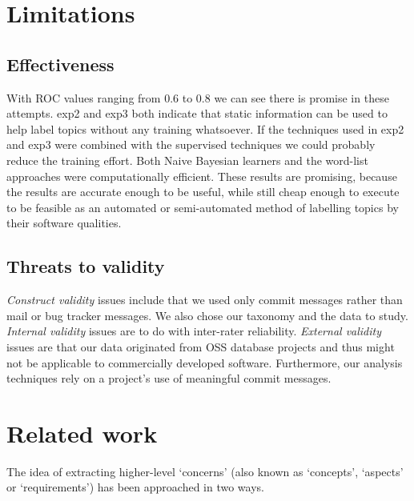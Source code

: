\documentclass[]{sig-alternate}
\begin{document}
\section{Limitations}
\subsection{Effectiveness}


With ROC values ranging from $0.6$ to $0.8$ we can see there is promise in these attempts. \textsf{exp2} and \textsf{exp3} both indicate that static information can be used to help label topics without any training whatsoever. If the techniques used in \textsf{exp2} and \textsf{exp3} were combined with the supervised techniques we could probably reduce the training effort. 
Both Naive Bayesian learners and the word-list approaches were computationally efficient.  These results are promising, because the results are accurate enough to be useful, while still cheap enough to execute to be feasible as an automated or semi-automated method of labelling topics by their software qualities.


\subsection{Threats to validity}
\emph{Construct validity} issues include that we used only commit messages rather than mail or bug tracker messages. We also chose our taxonomy and the data to study. \emph{Internal validity} issues are to do with inter-rater reliability. \emph{External validity} issues are that our data originated from OSS database projects and thus might not be applicable to commercially developed software. Furthermore, our analysis techniques rely on a project's use of meaningful commit messages.


\section{Related work}

The idea of extracting higher-level `concerns' (also known as `concepts', `aspects' or `requirements') has been approached in two ways. 
\end{document}
